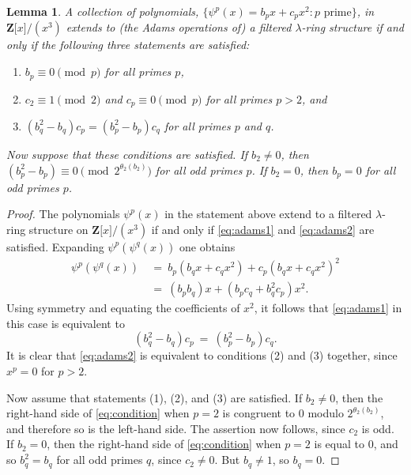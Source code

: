 \documentclass[reqno,11pt]{amsart}
\numberwithin{equation}{subsection}  %
\newtheorem{lemma}[subsection]{Lemma}
\newcommand{\bZ}{\mathbf{Z}}
\begin{document}
\medskip
\begin{lemma}
\label{lem1:n=3}
A collection of polynomials, $\lbrace \psi^p(x) = b_p x + c_p x^2 \colon p \text{ prime} \rbrace$, in $\bZ \lbrack x \rbrack/(x^3)$ extends to (the Adams operations of) a filtered $\lambda$-ring structure if and only if the following three statements are satisfied:
   \begin{enumerate}
   \item $b_p \equiv 0 \pmod{p}$ for all primes $p$,
   \item $c_2 \equiv 1 \pmod{2}$ and $c_p \equiv 0 \pmod{p}$ for all primes $p > 2$, and
   \item $(b_q^2 - b_q)c_p = (b_p^2 - b_p)c_q$ for all primes $p$ and $q$.
   \end{enumerate}
Now suppose that these conditions are satisfied.  If $b_2 \not= 0$, then $(b_p^2 - b_p) \equiv 0 \pmod{2^{\theta_2(b_2)}}$ for all odd primes $p$.  If $b_2 = 0$, then $b_p = 0$ for all odd primes $p$. 
\end{lemma}


\begin{proof}
The polynomials $\psi^p(x)$ in the statement above extend to a filtered $\lambda$-ring structure on $\bZ \lbrack x \rbrack/(x^3)$ if and only if \eqref{eq:adams1} and \eqref{eq:adams2} are satisfied.  Expanding $\psi^p(\psi^q(x))$ one obtains
   \[
   \begin{split}
   \psi^p(\psi^q(x)) 
   &~=~ b_p(b_qx + c_qx^2) + c_p(b_qx + c_qx^2)^2 \\
   &~=~ (b_pb_q)x + (b_pc_q + b_q^2 c_p)x^2.
   \end{split}
   \]
Using symmetry and equating the coefficients of $x^2$, it follows that \eqref{eq:adams1} in this case is equivalent to
   \begin{equation}
   \label{eq:condition}
   (b_q^2 - b_q)c_p ~=~ (b_p^2 - b_p)c_q.
   \end{equation}
It is clear that \eqref{eq:adams2} is equivalent to conditions (2) and (3) together, since $x^p = 0$ for $p > 2$.


Now assume that statements (1), (2), and (3) are satisfied.  If $b_2 \not= 0$, then the right-hand side of \eqref{eq:condition} when $p = 2$ is congruent to $0$ modulo $2^{\theta_2(b_2)}$, and therefore so is the left-hand side.  The assertion now follows, since $c_2$ is odd.  If $b_2 = 0$, then the right-hand side of \eqref{eq:condition} when $p = 2$ is equal to $0$, and so $b_q^2 = b_q$ for all odd primes $q$, since $c_2 \not= 0$.  But $b_q \not= 1$, so $b_q = 0$.
\end{proof}
\end{document}
